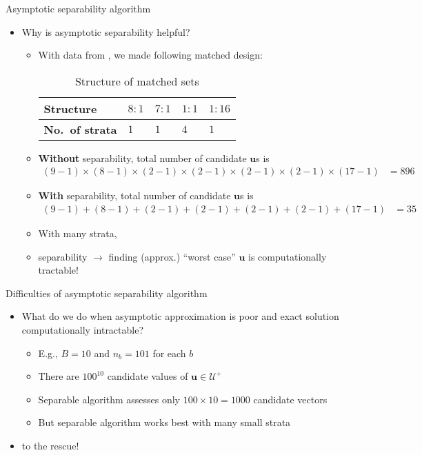 \documentclass[table, xcolor={dvipsnames}, 9pt]{beamer}
\theoremstyle{newstyle}
\begin{document}
\begin{frame}{Asymptotic separability algorithm}
\vfill
\begin{itemize} \vfill
\item Why is asymptotic separability helpful? \vfill
\begin{itemize} \vfill
\item With data from \citet{cerdaetal2012}, we made following matched design: \vfill
\vspace{2em}
\begin{table}[H]
\begin{tabular}{l|l|l|l|l}
\textbf{Structure} & $8:1$ & $7:1$ & $1:1$ & $1:16$ \\ \hline 
\textbf{No.~of strata} & $1$   & $1$   & $4$   & $1$ \\
\end{tabular}
\caption{Structure of matched sets}
\end{table} \vfill
\item \textbf{Without} separability, total number of candidate $\bm{u}$s is \vfill
\begin{align*}
(9 - 1) \times (8 - 1) \times (2 - 1) \times (2 - 1) \times (2 - 1) \times (2 - 1) \times (17 - 1) & = 896
\end{align*} \vfill
\item \textbf{With} separability, total number of candidate $\bm{u}$s is \vfill
\begin{align*}
(9 - 1) + (8 - 1) + (2 - 1) + (2 - 1) + (2 - 1) + (2 - 1) + (17 - 1) & = 35
\end{align*} \vfill
\item With many strata, \vfill
\item[] separability $\rightarrow$ finding (approx.) ``worst case'' $\bm{u}$ is computationally tractable! \vfill
\end{itemize} \vfill
\end{itemize} \vfill
\end{frame}
\begin{frame}{Difficulties of asymptotic separability algorithm}
\vfill
\begin{itemize} \vfill
\item What do we do when asymptotic approximation is poor and exact solution computationally intractable? \vfill
\begin{itemize} \vfill
\item E.g., $B = 10$ and $n_b = 101$ for each $b$ \vfill
\item[] There are $100^{10}$ candidate values of $\bm{u} \in \mathcal{U}^+$ \vfill
\item[] Separable algorithm assesses only $100 \times 10 = 1000$ candidate vectors \vfill
\item[] But separable algorithm works best with many small strata \vfill
\end{itemize} \vfill
\item \citet{rosenbaum2018} to the rescue!
\end{itemize} \vfill
\end{frame}
\end{document}
